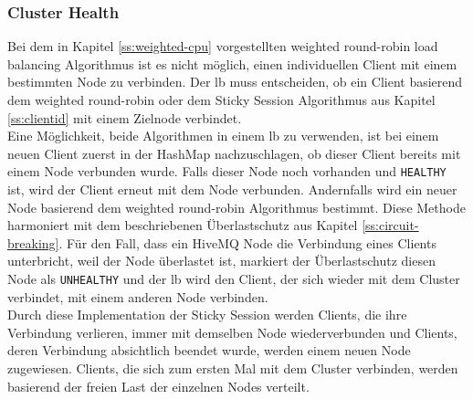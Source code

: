 \subsubsection{Cluster Health}
Bei dem in Kapitel \ref{ss:weighted-cpu} vorgestellten weighted round-robin load balancing Algorithmus ist es nicht möglich, einen individuellen Client mit einem bestimmten Node zu verbinden. Der \acl{lb} muss entscheiden, ob ein Client basierend dem weighted round-robin oder dem Sticky Session Algorithmus aus Kapitel \ref{ss:clientid} mit einem Zielnode verbindet.
\\
Eine Möglichkeit, beide Algorithmen in einem \acl{lb} zu verwenden, ist bei einem neuen Client zuerst in der HashMap nachzuschlagen, ob dieser Client bereits mit einem Node verbunden wurde. Falls dieser Node noch vorhanden und \verb|HEALTHY| ist, wird der Client erneut mit dem Node verbunden. Andernfalls wird ein neuer Node basierend dem weighted round-robin Algorithmus bestimmt.
Diese Methode harmoniert mit dem beschriebenen Überlastschutz aus Kapitel \ref{ss:circuit-breaking}. Für den Fall, dass ein HiveMQ Node die Verbindung eines Clients unterbricht, weil der Node überlastet ist, markiert der Überlastschutz diesen Node als \verb|UNHEALTHY| und der \acl{lb} wird den Client, der sich wieder mit dem Cluster verbindet, mit einem anderen Node verbinden.
\\
Durch diese Implementation der Sticky Session werden Clients, die ihre Verbindung verlieren, immer mit demselben Node wiederverbunden und Clients, deren Verbindung absichtlich beendet wurde, werden einem neuen Node zugewiesen. Clients, die sich zum ersten Mal mit dem Cluster verbinden, werden basierend der freien Last der einzelnen Nodes verteilt.
\newpage

